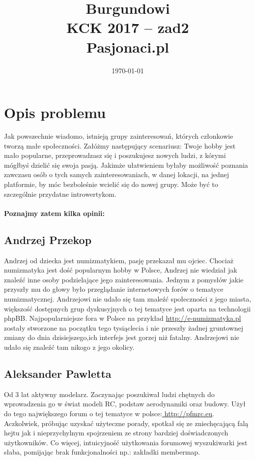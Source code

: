 \documentclass{article}
\title{Burgundowi\protect \\ \hfill \newline \newline KCK 2017 -- zad2\\ \newline\newline  Pasjonaci.pl\\ } %
\date{\today} %
\begin{document}
\maketitle  %
\thispagestyle{empty}
\newpage
\tableofcontents
\newpage

\section{Opis problemu}
  Jak powszechnie wiadomo, istnieją grupy zainteresowań, których członkowie tworzą małe społeczności. 
Załóżmy następujący scenariusz: Twoje hobby jest mało popularne, przeprowadzasz się i poszukujesz nowych ludzi, z kórymi mógłbyś dzielić się swoja pasją. Jakimże ułatwieniem byłaby możliwość poznania zawczasu osób o tych samych zainteresowaniach, w danej lokacji, na jednej platformie, by móc bezboleśnie wcielić się do nowej grupy. Może być to szczególnie przydatne introwertykom.\\ \\ \textbf{Poznajmy zatem kilka opinii:}

\subsection{Andrzej Przekop}
Andrzej od dziecka jest numizmatykiem, pasję przekazał mu ojciec. Chociaż numizmatyka jest dość popularnym hobby w Polsce, Andrzej nie wiedział jak znaleźć inne osoby podzielające jego zainteresowania. Jednym z pomysłów jakie przyszły mu do głowy było przeglądanie internetowych forów o tematyce numizmatycznej. Andrzejowi nie udało się tam znaleźć społeczności z jego miasta, większość dostępnych grup dyskusyjnych o tej tematyce jest oparta na technologii phpBB. Najpopularniejsze fora w Polsce na przykład \url{http://e-numizmatyka.pl} zostały stworzone na początku tego tysiąclecia i nie przeszły żadnej gruntownej zmiany do dnia dzisiejszego,ich interfejs jest gorzej niż fatalny. Andrzejowi nie udało się znaleźć tam nikogo z jego okolicy.
\newpage
\subsection{Aleksander Pawletta}
Od 3 lat aktywny modelarz. Zaczynając poszukiwał ludzi chętnych do wprowadzenia go w świat modeli RC, podstaw aerodynamiki oraz budowy. Użył do tego największego forum o tej tematyce w polsce:\url{ http://pfmrc.eu}.  Aczkolwiek, próbując uzyskać użyteczne porady, spotkał się ze zniechęcającą falą hejtu jak i nieprzychylnym spojrzeniem ze strony bardziej doświadczonych użytkowników. Co więcej, intuicyjność użytkowania forumowej wyszukiwarki jest słaba, pomijając brak funkcjonalności np.: zakładki membermap.
\end{document}
